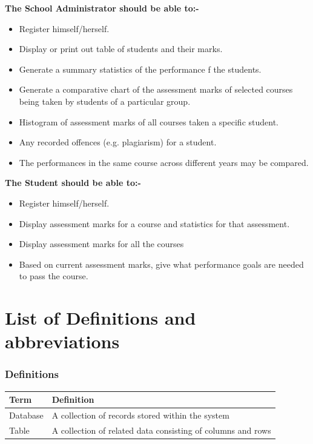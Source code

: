 \documentclass[10pt,onecolumn]{lab}
\begin{document}
\textbf{The School Administrator should be able to:-}
\begin{itemize}
\item Register himself/herself.
\item Display or print out table of students and their marks.
\item Generate a summary statistics of the performance f the students. 
\item Generate a comparative chart of the assessment marks of selected courses being taken by students of a particular group. 
\item Histogram of assessment marks of all courses taken a specific student.   
\item Any recorded offences (e.g. plagiarism) for a student.
\item The performances in the same course across different years may be compared.
\end{itemize}

\textbf{The Student should be able to:-}
\begin{itemize}
\item Register himself/herself.
\item Display assessment marks for a course and statistics for that assessment.
\item Display assessment marks for all the courses  
\item Based on current assessment marks, give what performance goals are needed to pass the course.
\end{itemize}

\section{List of Definitions and abbreviations}

\subsubsection{Definitions}
\begin{center}
    \begin{tabular}{ | p{3cm} | p{9cm} |}
\hline
\textbf{Term}& \textbf{Definition}\\ \hline
 Database & A collection of records stored within the system \\ \hline
 Table & A collection of related data consisting of columns and rows \\ \hline   
     \end{tabular}
\end{center}
\end{document}
